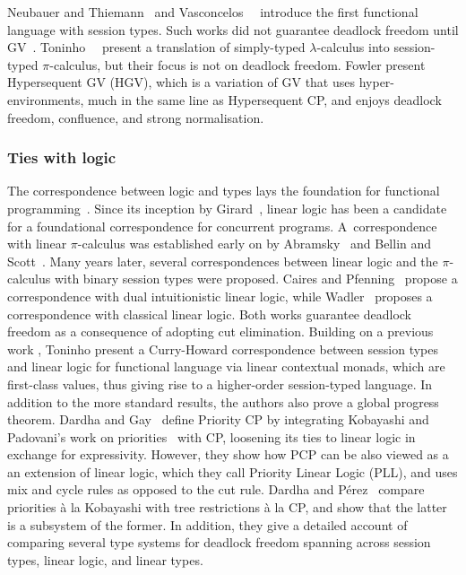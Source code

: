 Neubauer and Thiemann~\cite{neubauert04} and Vasconcelos~\etal~\cite{vasconcelosravara04,vasconcelosgay06} introduce the first functional language with session types. Such works did not guarantee deadlock freedom until GV~\cite{lindleymorris15,wadler14}.
Toninho~\etal~\cite{toninhocaires12} present a translation of simply-typed $\lambda$-calculus into session-typed $\pi$-calculus, but their focus is not on deadlock freedom.
Fowler \etal \cite{fowleretal21} present Hypersequent GV (HGV), which is a variation of GV that uses hyper-environments, much in the same line as Hypersequent CP, and enjoys deadlock freedom, confluence, and strong normalisation.

\subsubsection*{Ties with logic}
The correspondence between logic and types lays the foundation for functional programming~\cite{wadler15}.
Since its inception by Girard~\cite{girard87}, linear logic has been a candidate for a foundational correspondence for concurrent programs.
A~correspondence with linear $\pi$-calculus was established early on by Abramsky~\cite{abramsky94} and Bellin and Scott~\cite{bellinscott94}. Many years later, several correspondences between linear logic and the $\pi$-calculus with binary session types were proposed. Caires and Pfenning~\cite{cairespfenning10} propose a correspondence with dual intuitionistic linear logic, while Wadler~\cite{wadler12} proposes a correspondence with classical linear logic. Both works guarantee deadlock freedom as a consequence of adopting cut elimination.
Building on a previous work \cite{cairespfenning10}, Toninho \etal \cite{toninhoetal13} present a Curry-Howard correspondence between session types and linear logic for functional language via linear contextual monads, which are first-class values, thus giving rise to a higher-order session-typed  language. In addition to the more standard results, the authors also prove a global progress theorem.
Dardha and Gay~\cite{dardhagay18extended} define Priority CP by integrating Kobayashi and Padovani's work on priorities~\cite{kobayashi06,padovani14} with CP, loosening its ties to linear logic in exchange for expressivity. However, they show how PCP can be also {viewed as} a an extension of linear logic, which they call Priority Linear Logic (PLL), and uses mix and cycle rules as opposed to the cut rule.
Dardha and P\'{e}rez~\cite{dardhaperez15extended,dardhaperez15,DardhaP22} compare priorities \`a la Kobayashi with tree restrictions \`a la CP, and show that the latter is a subsystem of the former. In addition, they give a detailed account of comparing several type systems for deadlock freedom spanning across session types, linear logic, and linear types.
